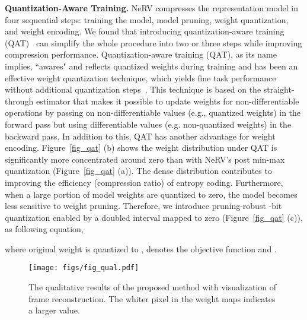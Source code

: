 \documentclass[sigconf]{acmart}
\begin{document}
\noindent\textbf{Quantization-Aware Training.}
NeRV compresses the representation model in four sequential steps: training the model, model pruning, weight quantization, and weight encoding.
We found that introducing quantization-aware training (QAT)~\cite{dorefa,qat,anypre} can simplify the whole procedure into two or three steps
while improving compression performance.
Quantization-aware training (QAT), as its name implies, ``awares" and reflects quantized weights during training and has been an effective weight quantization technique, which yields fine task performance without additional quantization steps~\cite{dorefa, qat, anypre}.
This technique is based on the straight-through estimator that makes it possible to update weights for non-differentiable operations by passing on non-differentiable values (e.g., quantized weights) in the forward pass but using differentiable values (e.g. non-quantized weights) in the backward pass.
In addition to this, QAT has another advantage for weight encoding.
Figure~\ref{fig_qat} (b) shows the weight distribution under QAT is significantly more concentrated around zero than with NeRV's post min-max quantization (Figure~\ref{fig_qat} (a)).
The dense distribution contributes to improving the efficiency (compression ratio) of entropy coding.
Furthermore, when a large portion of model weights are quantized to zero, the model becomes less sensitive to weight pruning.
Therefore, we introduce pruning-robust -bit quantization enabled by a doubled interval mapped to zero (Figure~\ref{fig_qat} (c)), as following equation,

where original weight  is quantized to ,  denotes the objective function and .




\begin{figure*}[ht]
\begin{center}
\texttt{[image: figs/fig\_qual.pdf]}
\end{center}
  \caption{The qualitative results of the proposed method with visualization of frame reconstruction. The whiter pixel in the weight maps indicates a larger value.}
\label{fig_qual}
\end{figure*}
\end{document}
